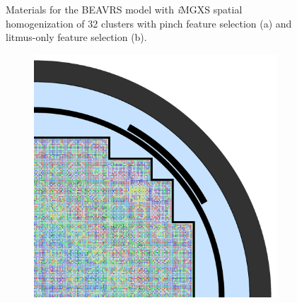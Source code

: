 \begin{figure}[h!]
\begin{subfigure}{0.67\textwidth}
  \caption{}
  \label{fig:chap10-full-core-combined-32}
\end{subfigure}
\caption[Clustered geometries for BEAVRS]{Materials for the \ac{BEAVRS} model with \textit{i}\ac{MGXS} spatial homogenization of 32 clusters with pinch feature selection (a) and litmus-only feature selection (b).}
\label{fig:chap10-full-core-geometries-32}
\end{figure}

\clearpage

\begin{figure}[h!]
\centering
\begin{subfigure}{0.67\textwidth}
  \centering
  \includegraphics[width=\linewidth]{figures/unsupervised/geometries/with-features/64-clusters/pinch/full-core}
  \caption{}
  \label{fig:chap10-full-core-pinch-64}
\end{subfigure}
\begin{subfigure}{0.67\textwidth}
  \centering

\end{subfigure}
\end{figure}
